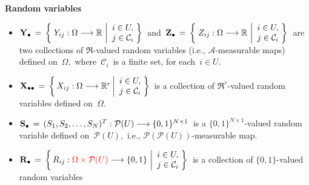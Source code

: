 \vskip 0.2cm
\noindent
\textbf{Random variables}
\begin{itemize}
\item
    $
    \mathbf{Y}_{\bullet}
    \, = \,
        \left\{\;
            Y_{ij} : \Omega \longrightarrow \mathbb{R}
            \,\left\vert
            \begin{array}{c} i \in U, \\ j \in \mathcal{C}_{i} \end{array}
            \right.
            \!\!\right\}
    $\,
    and
    \,$
    \mathbf{Z}_{\bullet}
    \, = \,
        \left\{\;
            Z_{ij} : \Omega \longrightarrow \mathbb{R}
            \,\left\vert
            \begin{array}{c} i \in U, \\ j \in \mathcal{C}_{i} \end{array}
            \right.
            \!\!\right\}
    $\,
    are two collections of $\Re$-valued random variables
    (i.e., $\mathscr{A}$-measurable maps)
    defined on \,$\Omega$,\,
    where \,$\mathcal{C}_{i}$\, is a finite set, for each \,$i \in U$.
\item
    $
    \mathbf{X}_{\bullet\bullet}
    \, = \,
        \left\{\,
            X_{ij} : \Omega \longrightarrow \mathbb{R}^{r}
            \left\vert
            \begin{array}{c} i \in U, \\ j \in \mathcal{C}_{i} \end{array}
            \right.
            \!\!\right\}
    $\,
    is a collection of $\Re^{r}$-valued random variables defined on \,$\Omega$.\,
\item
    $\mathbf{S}_{\bullet} \,=\, (S_{1},S_{2},\ldots,S_{N})^{T} : \mathcal{P}(U) \longrightarrow \{0,1\}^{N \times 1}$\,
    is a $\{0,1\}^{N \times 1}$-valued random variable defined on \,$\mathcal{P}(U)$,\,
    i.e., $\mathcal{P}(\mathcal{P}(U))$-measurable map.
\item
    $
    \mathbf{R}_{\bullet}
    \, = \,
        \left\{\,
            R_{ij} : {\color{red}\Omega \times \mathcal{P}(U)} \longrightarrow \{0,1\}
            \,\left\vert
            \begin{array}{c} i \in U, \\ j \in \mathcal{C}_{i} \end{array}
            \right.
            \!\!\right\}
    $\,
    is a collection of $\{0,1\}$-valued random variables

\end{itemize}
